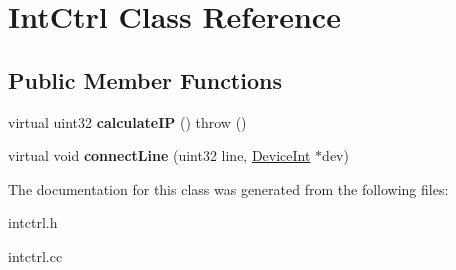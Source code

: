 \hypertarget{classIntCtrl}{
\section{IntCtrl Class Reference}
\label{classIntCtrl}
}
\subsection*{Public Member Functions}
\begin{DoxyCompactItemize}
\item 
\hypertarget{classIntCtrl_a62f4eae5fbfd7c96852003b02f95c69c}{
virtual uint32 {\bfseries calculateIP} ()  throw ()}
\label{classIntCtrl_a62f4eae5fbfd7c96852003b02f95c69c}

\item 
\hypertarget{classIntCtrl_adf3c4661976f3faabe89d161e10c91d0}{
virtual void {\bfseries connectLine} (uint32 line, \hyperlink{classDeviceInt}{DeviceInt} $\ast$dev)}
\label{classIntCtrl_adf3c4661976f3faabe89d161e10c91d0}

\end{DoxyCompactItemize}


The documentation for this class was generated from the following files:\begin{DoxyCompactItemize}
\item 
intctrl.h\item 
intctrl.cc\end{DoxyCompactItemize}
